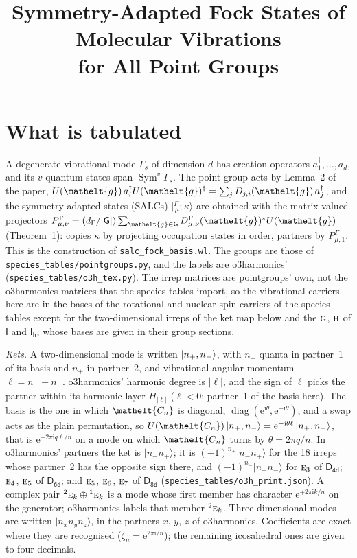 \documentclass[11pt]{article}
\title{Symmetry-Adapted Fock States of Molecular Vibrations\\ for All Point Groups}
\author{}\date{}
\newcommand{\eltfont}[1]{{\let\sigma\eltsigma\mathelt{#1}}}
\newcommand{\grp}[1]{\mathsf{#1}}
\newcommand{\irr}[1]{\text{\normalfont\scshape #1}}
\newcommand{\conjpair}[1]{{}^{#1}}
\newcommand{\elt}[1]{\eltfont{#1}}
\newcommand{\iunit}{\mathrm{i}}
\newcommand{\expe}{\mathrm{e}}
\newcommand{\rootunity}[1]{\zeta_{#1}}
\newcommand{\diag}{\operatorname{diag}}
\newcommand{\mult}{\kappa}
\newcommand{\cgket}[3]{\bigl\lvert{}^{#1}_{\,#2};#3\bigr\rangle}
\newcommand{\occ}[1]{\lvert #1\rangle}
\newcommand{\gel}{\elt{g}}             %
\begin{document}
\maketitle
\tableofcontents
\bigskip

\section{What is tabulated}

A degenerate vibrational mode $\Gamma_s$ of dimension $d$ has creation operators $a^\dagger_1,\ldots,a^\dagger_d$, and its $v$-quantum states span $\operatorname{Sym}^{v}\Gamma_s$. The point group acts by Lemma~2 of the paper, $U(\gel)\,a^\dagger_iU(\gel)^\dagger=\sum_jD_{j,i}(\gel)\,a^\dagger_j$, and the symmetry-adapted states (SALCs) $\cgket{\Gamma}{\mu}{\mult}$ are obtained with the matrix-valued projectors $P^\Gamma_{\mu,\nu}=(d_\Gamma/|\grp{G}|)\sum_{\gel\in\grp{G}}D^\Gamma_{\mu,\nu}(\gel)^*U(\gel)$ (Theorem~1): copies $\mult$ by projecting occupation states in order, partners by $P^\Gamma_{\mu,1}$. This is the construction of \texttt{salc\_fock\_basis.wl}. The groups are those of \texttt{species\_tables/pointgroups.py}, and the labels are o3harmonics' (\texttt{species\_tables/o3h\_tex.py}). The irrep matrices are pointgroups' own, not the o3harmonics matrices that the species tables import, so the vibrational carriers here are in the bases of the rotational and nuclear-spin carriers of the species tables except for the two-dimensional irreps of the ket map below and the $\irr{g}$, $\irr{h}$ of $\grp{I}$ and $\grp{I_{h}}$, whose bases are given in their group sections.

\emph{Kets.} A two-dimensional mode is written $\ket{n_+,n_-}$, with $n_-$ quanta in partner~1 of its basis and $n_+$ in partner~2, and vibrational angular momentum $\ell=n_+-n_-$. o3harmonics' harmonic degree is $|\ell|$, and the sign of $\ell$ picks the partner within its harmonic layer $H_{|\ell|}$ ($\ell<0$: partner~1 of the basis here). The basis is the one in which $\elt{C_{\mathnormal{n}}}$ is diagonal, $\diag(\expe^{\iunit\theta},\expe^{-\iunit\theta})$, and a swap acts as the plain permutation, so $U(\elt{C_{\mathnormal{n}}})\ket{n_+,n_-}=\expe^{-\iunit\theta\ell}\ket{n_+,n_-}$, that is $\expe^{-2\pi\iunit q\ell/n}$ on a mode on which $\elt{C_{\mathnormal{n}}}$ turns by $\theta=2\pi q/n$. In o3harmonics' partners the ket is $\occ{n_-n_+}$; it is $(-1)^{n_+}\occ{n_-n_+}$ for the 18 irreps whose partner~2 has the opposite sign there, and $(-1)^{n_-}\occ{n_+n_-}$ for $\irr{e}_{3}$ of $\grp{D_{4d}}$; $\irr{e}_{4}$, $\irr{e}_{5}$ of $\grp{D_{6d}}$; and $\irr{e}_{5}$, $\irr{e}_{6}$, $\irr{e}_{7}$ of $\grp{D_{8d}}$ (\texttt{species\_tables/o3h\_print.json}). A complex pair $\conjpair{2}\irr{e}_k\oplus\conjpair{1}\irr{e}_k$ is a mode whose first member has character $\expe^{+2\pi\iunit k/n}$ on the generator; o3harmonics labels that member $\conjpair{2}\irr{e}_k$. Three-dimensional modes are written $\occ{n_xn_yn_z}$, in the partners $x$, $y$, $z$ of o3harmonics. Coefficients are exact where they are recognised ($\rootunity{n}=\expe^{2\pi\iunit/n}$); the remaining icosahedral ones are given to four decimals.
\end{document}
